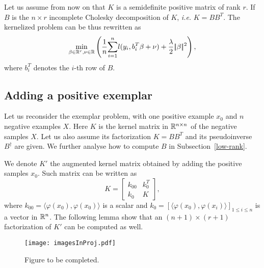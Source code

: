 
Let us assume from now on that $K$ is a semidefinite positive matrix
of rank $r$. If $B$ is the $n\times r$ incomplete Cholesky decomposition of $K$, \textit{i.e.} $K=BB^T$. The kernelized problem can be thus rewritten as 
\begin{equation}
\min_{\beta\in\mathbb R^r,\nu\in\mathbb R} \left( \dfrac{1}{n}\displaystyle{\sum_{i=1}^n} l(y_i, b_i^T\beta+\nu)+\dfrac{\lambda}{2}|\!|\beta|\!|^2\right), \label{beta:first}
\end{equation}
where $b_i^T$ denotes the $i$-th row of $B$.

\subsection{Adding a positive exemplar}
Let us reconsider the exemplar problem, with one positive example $x_0$ and $n$ negative examples $X$. Here $K$ is the kernel matrix in $\mathbb R^{n\times n}$ of the negative samples $X$. 
Let us also assume its factorization $K=BB^T$ and its pseudoinverse $B^\dagger$ are given. We further analyse how to compute $B$ in Subsection~\ref{low-rank}.

We denote $K'$ the augmented kernel matrix obtained by adding the positive samples $x_0$. Such matrix can be written as
\begin{equation}
K = \begin{bmatrix}
k_{00} & k_0^T\\
k_0 & K
\end{bmatrix},
\end{equation}
where $k_{00}=\langle \varphi(x_0),\varphi(x_0)\rangle$ is a scalar and $k_0= [\langle \varphi(x_0),\varphi(x_i)\rangle]_{1\le i\le n}$  is a vector in $\mathbb R^n$. 
The following lemma show that an $(n+1)\times (r+1)$ factorization of $K'$ can be computed as well.

\begin{figure}[!h]
\centering
\texttt{[image: imagesInProj.pdf]}
\caption{Figure to be completed.}
\label{proj}
\end{figure}

